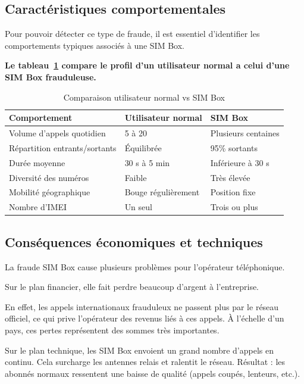 \documentclass[12pt, oneside, a4paper]{report}
\begin{document}
\subsection{Caractéristiques comportementales}
Pour pouvoir détecter ce type de fraude, il est essentiel d’identifier les comportements typiques associés à une SIM Box.

\vspace{0.5 cm}
\textbf{Le tableau~\ref{tab:simbox-vs-humain} compare le profil d'un utilisateur normal a celui d'une SIM Box frauduleuse.}

\begin{table}[h!]
\centering
\caption{Comparaison utilisateur normal vs SIM Box}
\label{tab:simbox-vs-humain}
\vspace{0.3cm}
\renewcommand{\arraystretch}{1.3}
\begin{tabular}{|l|l|l|}
\hline
\textbf{Comportement} & \textbf{Utilisateur normal} & \textbf{SIM Box} \\
\hline
Volume d'appels quotidien & 5 à 20 & Plusieurs centaines \\
\hline
Répartition entrants/sortants & Équilibrée & 95\% sortants \\
\hline
Durée moyenne & 30 s à 5 min & Inférieure à 30 s \\
\hline
Diversité des numéros & Faible & Très élevée \\
\hline
Mobilité géographique & Bouge régulièrement & Position fixe \\
\hline
Nombre d'IMEI & Un seul & Trois ou plus \\
\hline
\end{tabular}
\end{table}


\subsection{Conséquences économiques et techniques}
La fraude SIM Box cause plusieurs problèmes pour l'opérateur téléphonique.

Sur le plan financier, elle fait perdre beaucoup d'argent à l'entreprise. 

\vspace{0.3cm}
En effet, les appels internationaux frauduleux ne passent plus par le réseau officiel, ce qui prive l'opérateur des revenus liés à ces appels. À l'échelle d'un pays, ces pertes représentent des sommes très importantes.

Sur le plan technique, les SIM Box envoient un grand nombre d'appels en continu. Cela surcharge les antennes relais et ralentit le réseau. Résultat : les abonnés normaux ressentent une baisse de qualité (appels coupés, lenteurs, etc.).
\end{document}
